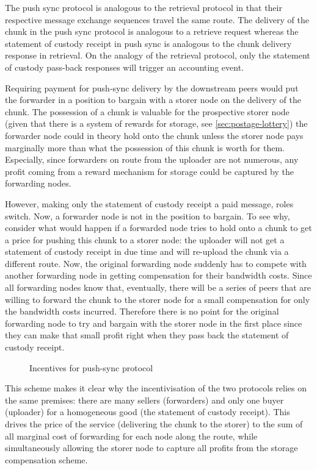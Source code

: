 The push sync protocol is analogous to 
the retrieval protocol in that their respective message exchange sequences travel the same route.
The delivery of the chunk in the push sync protocol is analogous to a retrieve request whereas the statement of custody receipt in push sync is analogous to the chunk delivery response in retrieval. On the analogy of the retrieval  protocol, only the statement of custody  pass-back responses will trigger an accounting event.

Requiring payment for push-sync delivery by the downstream peers would put the forwarder in a position to bargain with a storer node on the delivery of the chunk. The possession of a chunk is valuable for the prospective storer node (given that there is a system of rewards  for storage, see \ref{sec:postage-lottery}) the forwarder node could in theory hold onto the chunk unless the storer node pays marginally more than what the possession of this chunk is worth for them. Especially, since forwarders on route from the uploader are not numerous, any profit coming from a reward mechanism for storage could be captured by the forwarding nodes.

However,  making only the statement of custody receipt a paid message, roles switch. Now, a forwarder node is not in the position to bargain. To see why, consider what would happen if a forwarded node tries to hold onto a chunk to get a price for pushing this chunk to a storer node: the uploader will not get a statement of custody receipt in due time and will re-upload the chunk via a different route. Now, the original forwarding node suddenly has to compete with another forwarding node in getting compensation for their bandwidth costs. Since all forwarding nodes know that, eventually, there will be a series of peers that are willing to forward the chunk to the storer node for a small compensation for only the bandwidth costs incurred. Therefore there is no point for the original forwarding node to try and bargain with the storer node in the first place since they can make that small  profit right when they pass back the statement of custody receipt.

\begin{figure}[htbp]
\centering
\caption[Incentives for push-sync protocol]{Incentives for push-sync protocol}
\label{fig:syncing-swap}
\end{figure}

This scheme makes it clear why the incentivisation of the two  protocols relies on the same premises: there are many sellers (forwarders) and only one buyer (uploader) for a homogeneous good (the statement of custody receipt). This drives the price of the service (delivering the chunk to the storer) to the sum of all marginal cost of forwarding for each node along the route, while simultaneously allowing the storer node to capture all profits from the storage compensation scheme.

